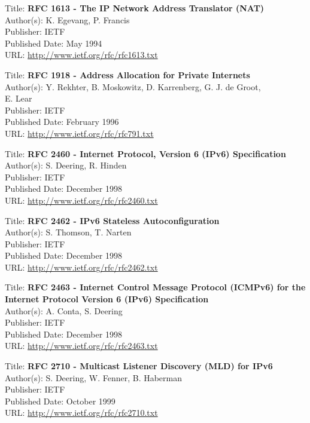 Title: \textbf{RFC 1613 - The IP Network Address Translator (NAT)} \\
Author(s): K. Egevang, P. Francis \\
Publisher: IETF \\ 
Published Date: May 1994  \\
URL: \url{http://www.ietf.org/rfc/rfc1613.txt}   


Title: \textbf{RFC 1918 - Address Allocation for Private Internets} \\
Author(s): Y. Rekhter, B. Moskowitz, D. Karrenberg, G. J. de Groot, \\
\hspace{15mm} E. Lear \\ 
Publisher: IETF \\ 
Published Date: February 1996  \\
URL: \url{http://www.ietf.org/rfc/rfc791.txt}    


Title: \textbf{RFC 2460 - Internet Protocol, Version 6 (IPv6) Specification} \\
Author(s): S. Deering, R. Hinden \\
Publisher: IETF \\ 
Published Date: December 1998 \\ 
URL: \url{http://www.ietf.org/rfc/rfc2460.txt}   


Title: \textbf{RFC 2462 - IPv6 Stateless Autoconfiguration} \\
Author(s): S. Thomson, T. Narten \\
Publisher: IETF \\ 
Published Date: December 1998\\
URL: \url{http://www.ietf.org/rfc/rfc2462.txt}   


Title: \textbf{RFC 2463 - Internet Control Message Protocol (ICMPv6) for the} \\
\hspace{15mm} \textbf{Internet Protocol Version 6 (IPv6) Specification} \\
Author(s): A. Conta, S. Deering \\
Publisher: IETF \\ 
Published Date: December 1998 \\ 
URL: \url{http://www.ietf.org/rfc/rfc2463.txt}   


Title: \textbf{RFC 2710 - Multicast Listener Discovery (MLD) for IPv6} \\ 
Author(s): S. Deering, W. Fenner, B. Haberman \\
Publisher: IETF \\ 
Published Date: October 1999 \\ 
URL: \url{http://www.ietf.org/rfc/rfc2710.txt}   


